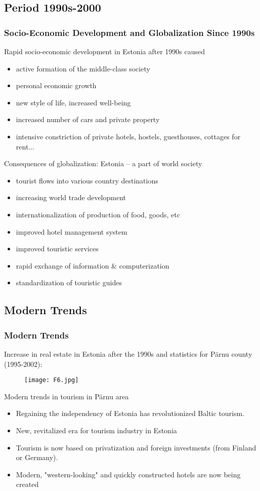 \documentclass[pdflatex,compress,8pt,
	xcolor={dvipsnames,dvipsnames,svgnames,x11names,table},
]{beamer}
\begin{document}
\subsection{Period 1990s-2000}
\begin{frame}\frametitle{Socio-Economic Development and Globalization Since 1990s}
Rapid socio-economic development in Estonia after 1990s caused
\begin{itemize}
	\item active formation of the middle-class society
	\item personal economic growth
	\item new style of life, increased well-being
	\item increased number of cars and private property
	\item intensive constriction of private hotels, hostels, guesthouses, cottages for rent...
\end{itemize}
Consequences of globalization: Estonia – a part of world society
\begin{itemize}
	\item tourist flows into various country destinations
	\item increasing world trade development
	\item internationalization of production of food, goods, etc 
	\item improved hotel management system
	\item improved touristic services
	\item rapid exchange of information \& computerization
	\item standardization of touristic guides
\end{itemize}
\end{frame} 

\subsection{Modern Trends}
\begin{frame}\frametitle{Modern Trends}
Increase in real estate in Estonia after the 1990s and statistics for Pärnu county (1995-2002):
\begin{figure}[H]
	\centering
		\texttt{[image: F6.jpg]}
\end{figure}
Modern trends in tourism in Pärnu area
\begin{itemize}
	\item Regaining the independency of Estonia has revolutionized Baltic tourism.
	\item New, revitalized era for tourism industry in Estonia
	\item Tourism is now based on privatization and foreign investments (from Finland or Germany).
	\item Modern, "western-looking" and quickly constructed hotels are now being created
\end{itemize}
\end{frame} 
\end{document}
